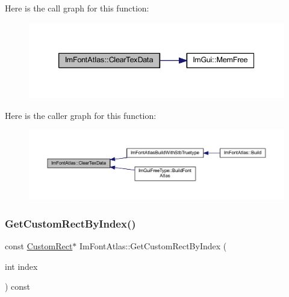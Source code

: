 Here is the call graph for this function\+:
\nopagebreak
\begin{figure}[H]
\begin{center}
\leavevmode
\includegraphics[width=339pt]{struct_im_font_atlas_a3ede4bd513bec044c77ac392ad9c6e86_cgraph}
\end{center}
\end{figure}
Here is the caller graph for this function\+:
\nopagebreak
\begin{figure}[H]
\begin{center}
\leavevmode
\includegraphics[width=350pt]{struct_im_font_atlas_a3ede4bd513bec044c77ac392ad9c6e86_icgraph}
\end{center}
\end{figure}
\mbox{\label{struct_im_font_atlas_a4d4403e920f1d93307936781050b52ee}} 
\subsubsection{\texorpdfstring{Get\+Custom\+Rect\+By\+Index()}{GetCustomRectByIndex()}}
{\footnotesize\ttfamily const \mbox{\hyperlink{struct_im_font_atlas_1_1_custom_rect}{Custom\+Rect}}$\ast$ Im\+Font\+Atlas\+::\+Get\+Custom\+Rect\+By\+Index (\begin{DoxyParamCaption}\item[{int}]{index }\end{DoxyParamCaption}) const\hspace{0.3cm}{\ttfamily [inline]}}

\mbox{\label{struct_im_font_atlas_ab32e8e79cc4f3b36ef447f70034e7c57}} 
